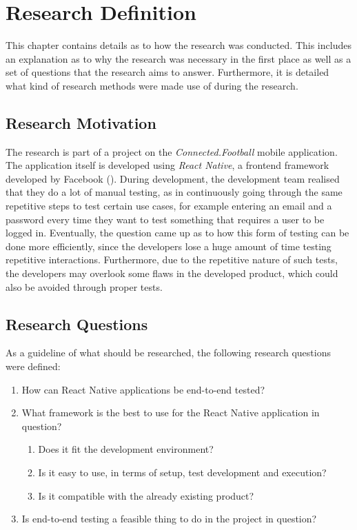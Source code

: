 \section{Research Definition}
\label{sec:research_definition}

This chapter contains details as to how the research was conducted. This includes an explanation as to why the research was necessary in the first place as well as a set of questions that the research aims to answer. Furthermore, it is detailed what kind of research methods were made use of during the research.

\subsection{Research Motivation}
\label{ssec:research_motivation}

The research is part of a project on the \textit{Connected.Football} mobile application. The application itself is developed using \textit{React Native}, a frontend framework developed by Facebook (\cite{react-native}).
\newline
During development, the development team realised that they do a lot of manual testing, as in continuously going through the same repetitive steps to test certain use cases, for example entering an email and a password every time they want to test something that requires a user to be logged in. Eventually, the question came up as to how this form of testing can be done more efficiently, since the developers lose a huge amount of time testing repetitive interactions. Furthermore, due to the repetitive nature of such tests, the developers may overlook some flaws in the developed product, which could also be avoided through proper tests.

\subsection{Research Questions}
\label{ssec:research_questions}

As a guideline of what should be researched, the following research questions were defined:

\begin{enumerate}
\item How can React Native applications be end-to-end tested?
\item What framework is the best to use for the React Native application in question?
\begin{enumerate}
\item Does it fit the development environment?
\item Is it easy to use, in terms of setup, test development and execution?
\item Is it compatible with the already existing product?
\end{enumerate}
\item Is end-to-end testing a feasible thing to do in the project in question?
\end{enumerate}

